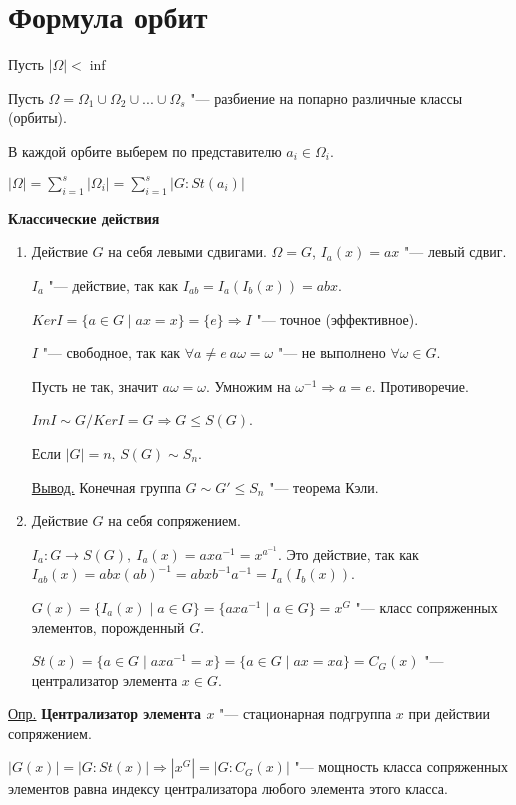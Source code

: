 \documentclass{article}
\begin{document}
\section{Формула орбит}

Пусть $|\Omega| < \inf$

Пусть $\Omega = \Omega_1 \cup \Omega_2 \cup ... \cup \Omega_s$ "--- разбиение на попарно различные классы (орбиты).

В каждой орбите выберем по представителю $a_i \in \Omega_i$.

$|\Omega| = \sum \limits_{i = 1}^{s} |\Omega_i| = \sum \limits_{i = 1}^{s} |G:St(a_i)|$

\textbf{Классические действия}
\begin{enumerate}
	\item Действие $G$ на себя левыми сдвигами. $\Omega = G$, $I_a(x) = ax$ "--- левый сдвиг.
	
	$I_a$ "--- действие, так как $I_{ab} = I_a(I_b(x)) = abx$.
	
	$KerI = \{a \in G \mid ax = x\} = \{e\} \Rightarrow I$ "--- точное (эффективное).
	
	$I$ "--- свободное, так как $\forall a \neq e \   a\omega = \omega$ "--- не выполнено $\forall \omega \in G$.
	
	Пусть не так, значит $a\omega = \omega$. Умножим на $\omega^{-1} \Rightarrow a = e$. Противоречие.
	
	$ImI \sim G/KerI = G \Rightarrow G \leq S(G)$.
	
	Если $|G| = n$, $S(G) \sim S_n$.
	
	\underline{Вывод.} Конечная группа $G \sim G' \leq S_n$ "--- теорема Кэли.
	
	\item Действие $G$ на себя сопряжением.
	
	$I_a: G \rightarrow S(G), \  I_a(x) = axa^{-1} = x^{a^{-1}}$. Это действие, так как $I_{ab}(x) = abx(ab)^{-1} = abxb^{-1}a^{-1} = I_a(I_b(x))$.
	
	$G(x) = \{I_a(x) \mid a \in G\} = \{axa^{-1} \mid a \in G \} = x^G$ "--- класс сопряженных элементов, порожденный $G$.
	
	$St(x) = \{a \in G \mid axa^{-1} = x\} = \{a \in G\mid ax = xa\} = C_G(x)$ "--- централизатор элемента $x \in G$.
\end{enumerate}

\underline{Опр.} \textbf{Централизатор элемента $x$} "--- стационарная подгруппа $x$ при действии сопряжением.

$|G(x)| = |G:St(x)| \Rightarrow |x^G| = |G:C_G(x)|$ "--- мощность класса сопряженных элементов равна индексу централизатора любого элемента этого класса.
\end{document}
